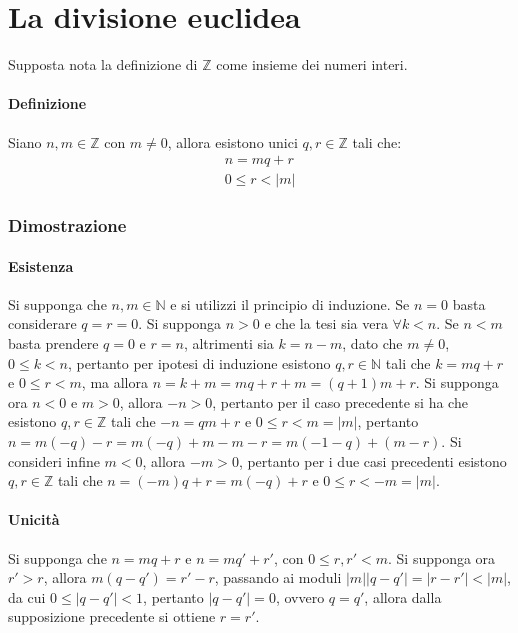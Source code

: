 \chapter{La divisione euclidea}
Supposta nota la definizione di $\mathbb{Z}$ come insieme dei numeri interi.
\subsubsection{Definizione}
Siano $n,m\in\mathbb{Z}$ con $m\neq 0$, allora esistono unici $q, r\in\mathbb{Z}$ tali che:
\begin{align*}
n=mq+r\\
0\le r<|m|
\end{align*}
\subsection{Dimostrazione}
\subsubsection{Esistenza}
Si supponga che $n,m \in\mathbb{N}$ e si utilizzi il principio di induzione. Se $n=0$ basta considerare $q=r=0$. Si supponga $n>0$ e che la tesi sia vera $\forall k<n$. Se $n<m$
basta prendere $q=0$ e $r=n$, altrimenti sia $k=n-m$, dato che $m\neq 0$, $0\le k<n$, pertanto per ipotesi di induzione esistono $q,r\in\mathbb{N}$ tali che $k=mq+r$ e $0\le 
r<m$, ma allora $n=k+m=mq+r+m=(q+1)m+r$. Si supponga ora $n<0$ e $m>0$, allora $-n>0$, pertanto per il caso precedente si ha che esistono $q,r\in\mathbb{Z}$ tali che $-n=qm+r$ e 
$0\le r<m=|m|$, pertanto $n=m(-q)-r=m(-q)+m-m-r=m(-1-q)+(m-r)$. Si consideri infine $m<0$, allora $-m>0$, pertanto per i due casi precedenti esistono $q, r\in\mathbb{Z}$ tali 
che $n=(-m)q+r=m(-q)+r$ e $0\le r<-m=|m|$.
\subsubsection{Unicit\`a}
Si supponga che $n=mq+r$ e $n=mq'+r'$, con $0\le r,r'<m$. Si supponga ora $r'>r$, allora $m(q-q')=r'-r$, passando ai moduli $|m||q-q'|=|r-r'|<|m|$, da cui $0\le |q-q'|<1$, 
pertanto $|q-q'|=0$, ovvero $q=q'$, allora dalla supposizione precedente si ottiene $r=r'$.
